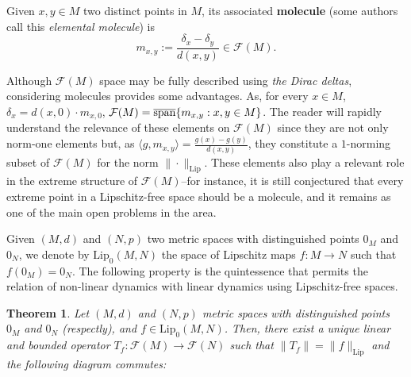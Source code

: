\documentclass[11pt,reqno]{article}
\newtheorem{theorem}[statement]{Theorem}
\newcommand{\free}[1]{\mathcal{F}(#1)} %
\def\lip{ \text{Lip}}
\def\sp{\hbox{{\rm span}}}
\def\csp{\overline{\sp}}
\def\dd{\delta}
\def\la{\langle}
\def\ra{\rangle}
\begin{document}
 Given $x,y \in M$ two distinct points in $M$, its associated \textbf{molecule} (some authors call this \textit{elemental molecule}) is
 \[m_{x,y}:= \frac{\dd_x -\dd_y}{d(x,y)}\in \free{M}.   \]
  
Although $\free{M}$ space may be fully described using \textit{the Dirac deltas}, considering molecules provides some advantages. As, for every $x\in M$, ${\dd_x}={d(x,0)}\cdot m_{x,0}$, $\free{M}= \csp\{m_{x,y}: x,y \in M\}$. The reader will rapidly understand the relevance of these elements on $\free{M}$ since they are not only norm-one elements but, as $\la g, m_{x,y} \ra= \frac{g(x)-g(y)}{d(x,y)}$, they constitute a $1$-norming subset of $\free{M}$ for the norm $\|\cdot\|_{\lip}$. These elements also play a relevant role in the extreme structure of $\free{M}$--for instance, it is still conjectured that every extreme point in a Lipschitz-free space should be a molecule, and it remains as one of the main open problems in the area. 


Given $(M,d)$ and $(N,p)$ two metric spaces with distinguished points $0_M$ and $0_N$, we denote by $\lip_0(M,N)$ the space of Lipschitz maps $f\colon M\to N$ such that $f(0_M)=0_N$.
The following property is the quintessence that permits the relation of non-linear dynamics with linear dynamics using Lipschitz-free spaces.

\begin{theorem}\label{thm:linearization}
    Let $(M,d)$ and $(N,p)$ metric spaces with distinguished points $0_M$ and $0_N$ (respectly), and $f\in \lip_0(M,N)$. Then, there exist a unique linear and bounded operator $T_f\colon \free{M}\to \free{N}$ such that $\|T_f\|=\|f\|_\lip$ and the following diagram commutes:

    \begin{center}
\end{center}
\end{theorem}
\end{document}
